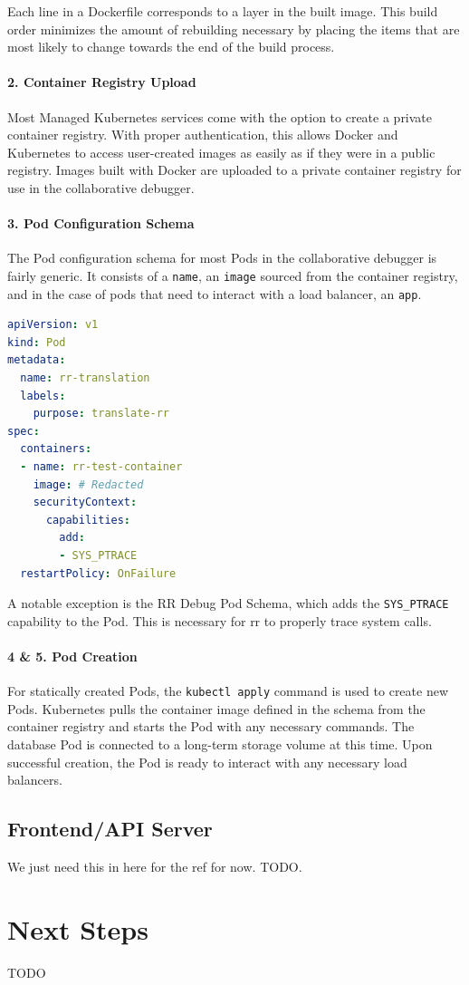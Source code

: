 \documentclass[12pt]{article}
\begin{document}
Each line in a Dockerfile corresponds to a layer in the built image.
This build order minimizes the amount of rebuilding necessary by
placing the items that are most likely to change towards the end of
the build process.

\paragraph{2. Container Registry Upload}

Most Managed Kubernetes services come with the option to create a
private container registry.  With proper authentication, this allows
Docker and Kubernetes to access user-created images as easily as if
they were in a public registry.  Images built with Docker are uploaded
to a private container registry for use in the collaborative debugger.

\paragraph{3. Pod Configuration Schema}

The Pod configuration schema for most Pods in the collaborative
debugger is fairly generic.  It consists of a \lstinline{name}, an
\lstinline{image} sourced from the container registry, and in the case
of pods that need to interact with a load balancer, an
\lstinline{app}.

\begin{lstlisting}[language=YAML,basicstyle=\linespread{0.5}\ttfamily,caption={RR Debug Pod Schema},captionpos=b]
apiVersion: v1
kind: Pod
metadata:
  name: rr-translation
  labels:
    purpose: translate-rr
spec:
  containers:
  - name: rr-test-container
    image: # Redacted
    securityContext:
      capabilities:
        add:
        - SYS_PTRACE
  restartPolicy: OnFailure
\end{lstlisting}

A notable exception is the RR Debug Pod Schema, which adds the
\lstinline{SYS_PTRACE} capability to the Pod.  This is necessary for
rr to properly trace system calls.

\paragraph{4 \& 5. Pod Creation}

For statically created Pods, the \lstinline{kubectl apply} command is
used to create new Pods.  Kubernetes pulls the container image defined
in the schema from the container registry and starts the Pod with any
necessary commands.  The database Pod is connected to a long-term
storage volume at this time.  Upon successful creation, the Pod is
ready to interact with any necessary load balancers.

\subsection{Frontend/API Server}\label{api}

We just need this in here for the ref for now. TODO.

\section{Next Steps}

TODO

\pagebreak

{}
\end{document}
